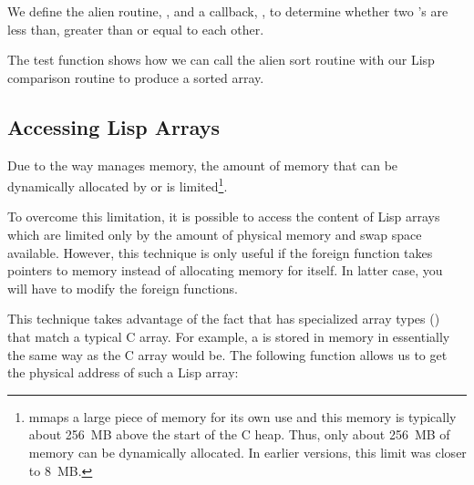We define the alien routine, , and a callback, ,
to determine whether two 's are less than, greater than
or equal to each other.

The test function  shows how we can call the alien
sort routine with our Lisp comparison routine to produce a sorted
array.

\subsection{Accessing Lisp Arrays}

Due to the way \cmucl{} manages memory, the amount of memory that can
be dynamically allocated by  or  is
limited\footnote{\cmucl{} mmaps a large piece of memory for its own
use and this memory is typically about 256~MB above the start of the C
heap. Thus, only about 256~MB of memory can be dynamically allocated.
In earlier versions, this limit was closer to 8~MB.}.

To overcome this limitation, it is possible to access the content of
Lisp arrays which are limited only by the amount of physical memory
and swap space available.  However, this technique is only useful if
the foreign function takes pointers to memory instead of allocating
memory for itself.  In latter case, you will have to modify the
foreign functions.

This technique takes advantage of the fact that \cmucl{} has
specialized array types () that match
a typical C array.  For example, a  is stored in memory in essentially the same way as the C
array  would be.  The following function allows us
to get the physical address of such a Lisp array:

